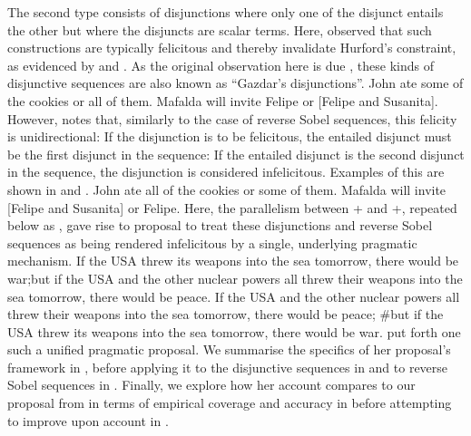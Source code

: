The second type consists of disjunctions where only one of the disjunct entails the other but where the disjuncts are scalar terms. Here, \textcite{Gazdar1979} observed that such constructions are typically felicitous and thereby invalidate Hurford's constraint, as evidenced by  and . As the original observation here is due \textcite{Gazdar1979}, these kinds of disjunctive sequences are also known as \enquote{Gazdar's disjunctions}.
\pex\label{ex:scalardisjunction-good}
\a John ate some of the cookies or all of them.
\a Mafalda will invite Felipe or [Felipe and Susanita].
\xe
However, \textcite{Singh2008} notes that, similarly to the case of reverse Sobel sequences, this felicity is unidirectional: If the disjunction is to be felicitous, the entailed disjunct must be the first disjunct in the sequence: If the entailed disjunct is the second disjunct in the sequence, the disjunction is considered infelicitous. Examples of this are shown in  and .
\pex\label{ex:scalardisjunction-bad}
\a\ljudge{\#}John ate all of the cookies or some of them.
\a\ljudge{\#}Mafalda will invite [Felipe and Susanita] or Felipe.
\xe
Here, the parallelism between + and +, repeated below as , gave rise to  proposal to treat these disjunctions and reverse Sobel sequences as being rendered infelicitous by a single, underlying pragmatic mechanism.
\pex\label{ex:yetanotherusrss}
\a{}If the USA threw its weapons into the sea tomorrow, there would be war;\linebreak but if the USA and the other nuclear powers all threw their weapons into the sea tomorrow, there would be peace.\hfill\parencite[p. 10]{Lewis1973}
\a{}If the USA and the other nuclear powers all threw their weapons into the sea tomorrow, there would be peace; \#but if the USA threw its weapons into the sea tomorrow, there would be war.\hfill\parencite{Heim1994}
\xe
\textcite{Ippolito2020} put forth one such a unified pragmatic proposal. We summarise the specifics of her proposal's framework in , before applying it to the disjunctive sequences in  and to reverse Sobel sequences in . Finally, we explore how her account compares to our proposal from  in terms of empirical coverage and accuracy in  before attempting to improve upon  account in .


